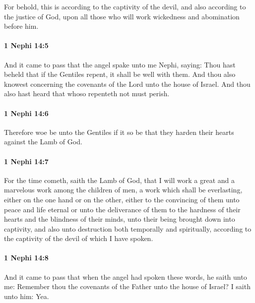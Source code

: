 			For behold, this is according to the captivity of the devil,
			and also according to the justice of God,
			upon all those who will work wickedness and abomination before him.

		\paragraph{1 Nephi 14:5} %
			\label{1NEPHI-14-5}

			And it came to pass that the angel spake unto me Nephi, saying:
			Thou hast beheld that if the Gentiles repent, it shall be well with them.
			And thou also knowest concerning the covenants of the Lord
			unto the house of Israel.
			And thou also hast heard that whoso repenteth not must perish.

		\paragraph{1 Nephi 14:6} %
			\label{1NEPHI-14-6}

			Therefore woe be unto the Gentiles
			if it so be that they harden their hearts against the Lamb of God.

		\paragraph{1 Nephi 14:7} %
			\label{1NEPHI-14-7}

			For the time cometh, saith the Lamb of God,
			that I will work a great and a marvelous work among the children of men,
			a work which shall be everlasting,
			either on the one hand or on the other,
			either to the convincing of them unto peace and life eternal
			or unto the deliverance of them to the hardness of their hearts
			and the blindness of their minds,
			unto their being brought down into captivity,
			and also unto destruction both temporally and spiritually,
			according to the captivity of the devil of which I have spoken.

		\paragraph{1 Nephi 14:8} %
			\label{1NEPHI-14-8}

			And it came to pass that
			when the angel had spoken these words,
			he saith unto me:
			Remember thou the covenants of the Father unto the house of Israel?
			I saith unto him: Yea.

